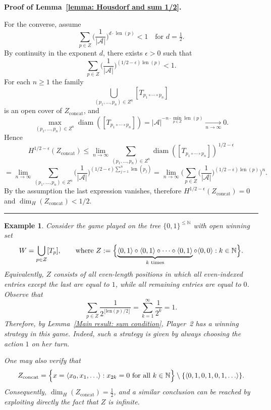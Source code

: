 \documentclass[a4,12pt]{article}%
\newtheorem{example}[theorem]{Example}
\newenvironment{proof}[1][Proof]{\textbf{#1.} }{\ \rule{0.5em}{0.5em}}
\begin{document}
\begin{proof}[Proof of Lemma~\ref{lemma: Housdorf and sum 1/2}]
\medskip

For the converse, assume
\[
\sum_{p\in Z}\biggl(\frac{1}{|\mathcal A|}\biggr)^{d\cdot\operatorname{len}(p)}<1
\quad\text{for }d=\tfrac12.
\]
By continuity in the exponent \(d\), there exists \(\epsilon>0\) such that
\[
\sum_{p\in Z}\biggl(\frac{1}{|\mathcal A|}\biggr)^{(1/2-\epsilon)\operatorname{len}(p)}<1.
\]
For each \(n\ge 1\) the family
\[
\bigcup_{(p_1,\dots,p_n)\in Z^n} [T_{p_1\circ\cdots\circ p_n}]
\]
is an open cover of \(Z_{\mathrm{concat}}\), and
\[
\max_{(p_1,\dots,p_n)\in Z^n}\operatorname{diam}([T_{p_1\circ\cdots\circ p_n}])
=|\mathcal A|^{-n\cdot \min_{p\in Z}\operatorname{len}(p)} \underset{n \to \infty}{\to}0.
\]
Hence
\[
H^{1/2-\epsilon}(Z_{\mathrm{concat}})
\le
\lim_{n\to\infty}
\sum_{(p_1,\dots,p_n)\in Z^n}
\operatorname{diam}([T_{p_1\circ\cdots\circ p_n}])^{\,1/2-\epsilon}
\]
\[
=
\lim_{n\to\infty}
\sum_{(p_1,\dots,p_n)\in Z^n}
\biggl(\frac{1}{|\mathcal A|}\biggr)^{(1/2-\epsilon)\sum_{j=1}^n\operatorname{len}(p_j)}
=
\lim_{n\to\infty}
\Biggl(
\sum_{p\in Z}\biggl(\frac{1}{|\mathcal A|}\biggr)^{(1/2-\epsilon)\operatorname{len}(p)}
\Biggr)^{\!n}.
\]
By the assumption the last expression vanishes, therefore \(H^{1/2-\epsilon}(Z_{\mathrm{concat}})=0\) and \(\dim_H(Z_{\mathrm{concat}})<1/2\).
\end{proof}

\begin{example}\label{example: infinite minimal size is win for 2}
Consider the game played on the tree $\{0,1\}^{\le \mathbb{N}}$ with open winning set
\[
W=\bigcup_{p\in Z}[T_p],
\qquad
\text{where }
Z:=\Bigl\{\underbrace{\langle 0,1\rangle \circ \langle 0,1\rangle \circ \cdots \circ \langle 0,1\rangle}_{k\text{ times}} \circ \langle 0,0\rangle : k\in \mathbb{N}\Bigr\}.
\]
Equivalently, $Z$ consists of all even-length positions in which all even-indexed entries except the last are equal to $1$, while all remaining entries are equal to $0$. Observe that
\[
\sum_{p\in Z} \frac{1}{2^{\lfloor \mathrm{len}(p)/2 \rfloor}}
=\sum_{k=1}^{\infty} \frac{1}{2^k}
=1.
\]
Therefore, by Lemma~\ref{Main result: sum condition}, Player~2 has a winning strategy in this game. Indeed, such a strategy is given by always choosing the action $1$ on her turn.

One may also verify that
\[
Z_{\mathrm{concat}}
=
\Bigl\{ x=\langle x_0,x_1,\ldots\rangle : x_{2k}=0 \text{ for all } k\in\mathbb{N} \Bigr\}
\setminus
\{\langle 0,1,0,1,0,1,\ldots\rangle\}.
\]
Consequently, $\dim_H(Z_{\mathrm{concat}})=\tfrac12$, and a similar conclusion can be reached by exploiting directly the fact that $Z$ is infinite.
\end{example}
\end{document}
